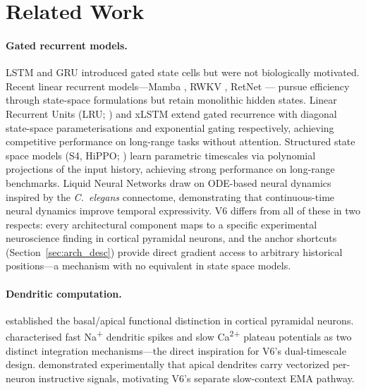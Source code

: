 \documentclass[11pt,a4paper]{article}
\begin{document}
\section{Related Work}

\paragraph{Gated recurrent models.}
LSTM \citep{hochreiter1997long} and GRU \citep{cho2014learning} introduced
gated state cells but were not biologically motivated.
Recent linear recurrent models---Mamba \citep{gu2023mamba},
RWKV \citep{peng2023rwkv}, RetNet \citep{sun2023retentive}---
pursue efficiency through state-space formulations but
retain monolithic hidden states.
Linear Recurrent Units (LRU; \citealt{orvieto2023resurrecting}) and
xLSTM \citep{beck2024xlstm} extend gated recurrence with diagonal
state-space parameterisations and exponential gating respectively,
achieving competitive performance on long-range tasks without attention.
Structured state space models (S4, HiPPO; \citealt{gu2020hippo,gu2022efficiently})
learn parametric timescales via polynomial projections of the input history,
achieving strong performance on long-range benchmarks.
Liquid Neural Networks \citep{hasani2021liquid} draw on ODE-based neural
dynamics inspired by the \emph{C.\ elegans} connectome, demonstrating
that continuous-time neural dynamics improve temporal expressivity.
V6 differs from all of these in two respects: every architectural component
maps to a specific experimental neuroscience finding in cortical pyramidal
neurons, and the anchor shortcuts (Section~\ref{sec:arch_desc}) provide
direct gradient access to arbitrary historical positions---a mechanism
with no equivalent in state space models.

\paragraph{Dendritic computation.}
\citet{larkum2013cellular} established the basal/apical functional
distinction in cortical pyramidal neurons.
\citet{losonczy2006integrative} characterised fast Na\textsuperscript{+}
dendritic spikes and slow Ca\textsuperscript{2+} plateau potentials
as two distinct integration mechanisms---the direct inspiration for
V6's dual-timescale design.
\citet{francioni2026vectorized} demonstrated experimentally that apical
dendrites carry vectorized per-neuron instructive signals, motivating V6's
separate slow-context EMA pathway.
\end{document}
